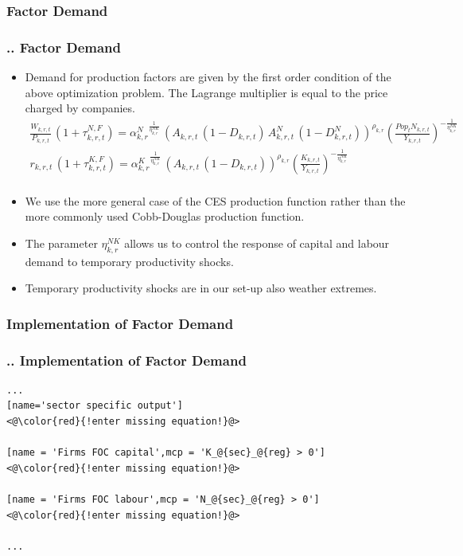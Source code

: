 \documentclass[11pt,aspectratio=169]{beamer}
\begin{document}
\subsubsection{Factor Demand}
\begin{frame}
\frametitle{{\thesection.\thesubsection.\thesubsubsection} Factor Demand}
\scriptsize
\begin{itemize}
\item Demand for production factors are given by the first order condition of the above optimization problem. The Lagrange multiplier is equal to the price charged by companies. 
\begin{align*}
\frac{W_{k,r,t}}{P_{k,r,t}}  \, (1 + \tau^{N,F}_{k,r,t}) = {\alpha^{N}_{k,r}}^{\frac{1}{\eta^{NK}_{k,r}}} \, \left(A_{k,r,t} \, (1 - D_{k,r,t}) \, A^N_{k,r,t} \, (1 - D^N_{k,r,t})\right)^{\rho_{k,r}} \left(\frac{Pop_{t} N_{k,r,t}}{Y_{k,r,t}}\right)^{-\frac{1}{\eta^{NK}_{k,r}}} \nonumber \\ 
r_{k,r,t} \, (1 + \tau^{K,F}_{k,r,t}) = {\alpha^{K}_{k,r}}^{\frac{1}{\eta^{NK}_{k,r}}} \, \left(A_{k,r,t} \, (1 - D_{k,r,t})\right)^{\rho_{k,r}}\left(\frac{K_{k,r,t}}{Y_{k,r,t}} \right)^{-\frac{1}{\eta^{NK}_{k,r}}} \\ 
\end{align*}
\item We use the more general case of the CES production function rather than the more commonly used Cobb-Douglas production function. 
\item The parameter $\eta^{NK}_{k,r}$ allows us to control the response of capital and labour demand to temporary productivity shocks. 
\item Temporary productivity shocks are in our set-up also weather extremes. 
\end{itemize}
\end{frame}

\subsubsection{Implementation of Factor Demand}
\begin{frame}[fragile]
\frametitle{{\thesection.\thesubsection.\thesubsubsection} Implementation of Factor Demand}

\begin{lstlisting}[frame = single]
...
[name='sector specific output']
<@\color{red}{!enter missing equation!}@>

[name = 'Firms FOC capital',mcp = 'K_@{sec}_@{reg} > 0']
<@\color{red}{!enter missing equation!}@>

[name = 'Firms FOC labour',mcp = 'N_@{sec}_@{reg} > 0']
<@\color{red}{!enter missing equation!}@>

...
\end{lstlisting}
\end{frame}
\end{document}
